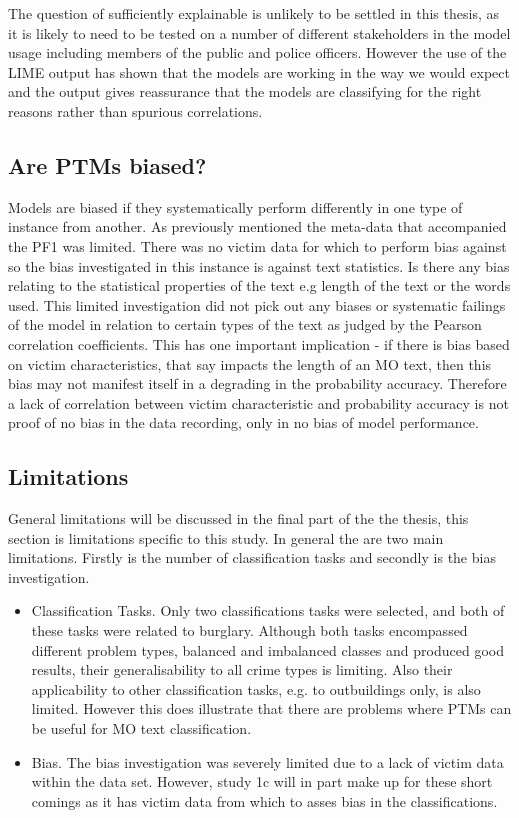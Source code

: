 The question of sufficiently explainable is unlikely to be settled in this thesis, as it is likely to need to be tested on a number of different stakeholders in the model usage including members of the public and police officers. However the use of the LIME output has shown that the models are working in the way we would expect and the output gives reassurance that the models are classifying for the right reasons rather than spurious correlations. 


\subsection{Are PTMs biased?} Models are biased if they systematically perform differently in one type of instance from another. As previously mentioned the meta-data that accompanied the PF1 was limited. There was no victim data for which to perform bias against so the bias investigated in this instance is against text statistics. Is there any bias relating to the statistical properties of the text e.g length of the text or the words used. This limited investigation did not pick out any biases or systematic failings of the model in relation to certain types of the text as judged by the Pearson correlation coefficients. This has one important implication - if there is bias based on victim characteristics, that say impacts the length of an MO text, then this bias may not manifest itself in a degrading in the probability accuracy. Therefore a lack of correlation between victim characteristic and probability accuracy is not proof of no bias in the data recording, only in no bias of model performance. 


\subsection{Limitations} General limitations will be discussed in the final part of the the thesis, this section is limitations specific to this study. In general the are two main limitations. Firstly is the number of classification tasks and secondly is the bias investigation.

\begin{itemize}
    \item Classification Tasks. Only two classifications tasks were selected, and both of these tasks were related to burglary. Although both tasks encompassed different problem types, balanced and imbalanced classes and produced good results, their generalisability to all crime types is limiting. Also their applicability to other classification tasks, e.g. to outbuildings only, is also limited. However this does illustrate that there are problems where PTMs can be useful for MO text classification.
    
    \item Bias. The bias investigation was severely limited due to a lack of victim data within the data set. However, study 1c will in part  make up for these short comings as it has victim data from which to asses bias in the classifications. 
    
\end{itemize}

